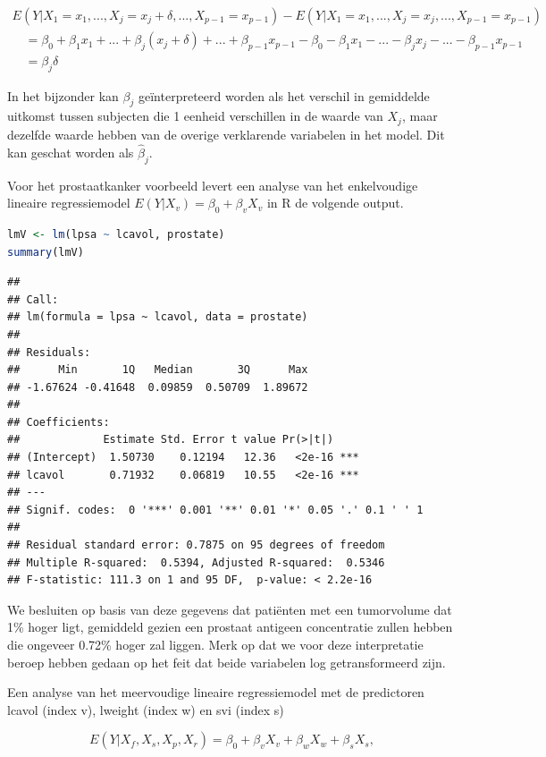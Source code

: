 \documentclass[
  12pt,dutch,coursenotes]{book}
\theoremstyle{definition}
\theoremstyle{definition}
\theoremstyle{definition}
\theoremstyle{definition}
\theoremstyle{remark}
\begin{document}
\[
\begin{array}{l}
E(Y|X_1=x_1,...,X_j=x_j+\delta,...,X_{p-1}=x_{p-1}) - E(Y|X_1=x_1,...,X_j=x_j,...,X_{p-1}=x_{p-1}) \\
\quad =\beta_0 + \beta_1 x_1 + ... + \beta_j(x_j+\delta)+...+\beta_{p-1} x_{p-1} - \beta_0 - \beta_1 x_1 - ... - \beta_jx_j-...-\beta_{p-1} x_{p-1} \\
\quad= \beta_j\delta
\end{array}
\]

In het bijzonder kan \(\beta_j\) geïnterpreteerd worden als het verschil in gemiddelde uitkomst tussen subjecten die 1 eenheid verschillen in de
waarde van \(X_j\), maar dezelfde waarde hebben van de overige verklarende variabelen in het model. Dit kan geschat worden als \(\hat{\beta}_j\).

Voor het prostaatkanker voorbeeld levert een analyse van het enkelvoudige lineaire regressiemodel \(E(Y|X_v)=\beta_0+\beta_v X_v\) in R de volgende output.

\begin{lstlisting}[language=R]
lmV <- lm(lpsa ~ lcavol, prostate)
summary(lmV)
\end{lstlisting}

\begin{lstlisting}
## 
## Call:
## lm(formula = lpsa ~ lcavol, data = prostate)
## 
## Residuals:
##      Min       1Q   Median       3Q      Max 
## -1.67624 -0.41648  0.09859  0.50709  1.89672 
## 
## Coefficients:
##             Estimate Std. Error t value Pr(>|t|)    
## (Intercept)  1.50730    0.12194   12.36   <2e-16 ***
## lcavol       0.71932    0.06819   10.55   <2e-16 ***
## ---
## Signif. codes:  0 '***' 0.001 '**' 0.01 '*' 0.05 '.' 0.1 ' ' 1
## 
## Residual standard error: 0.7875 on 95 degrees of freedom
## Multiple R-squared:  0.5394, Adjusted R-squared:  0.5346 
## F-statistic: 111.3 on 1 and 95 DF,  p-value: < 2.2e-16
\end{lstlisting}

We besluiten op basis van deze gegevens dat patiënten met een tumorvolume dat 1\% hoger ligt, gemiddeld gezien een prostaat antigeen concentratie zullen hebben die ongeveer 0.72\% hoger zal liggen. Merk op dat we voor deze interpretatie beroep hebben gedaan op het feit dat beide variabelen log getransformeerd zijn.

Een analyse van het meervoudige lineaire regressiemodel met de predictoren lcavol (index v), lweight (index w) en svi (index s)

\[
E(Y|X_f,X_s,X_p,X_r)=\beta_0 +\beta_v X_v+\beta_w X_w+\beta_s X_s,
\]
\end{document}
